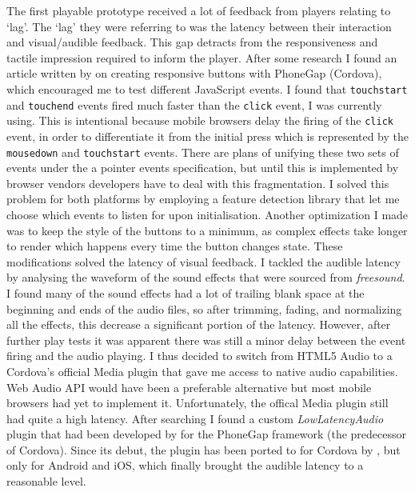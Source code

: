 \documentclass[final]{cmpreport}
\begin{document}
The first playable prototype received a lot of feedback from players relating to `lag'. The `lag' they were referring to was the latency between their interaction and visual/audible feedback. This gap detracts from the responsiveness and tactile impression required to inform the player. After some research I found an article written by \cite{Croft} on creating responsive buttons with PhoneGap (Cordova), which encouraged me to test different JavaScript events. I found that \texttt{touchstart} and \texttt{touchend} events fired much faster than the \texttt{click} event, I was currently using. This is intentional because mobile browsers delay the firing of the \texttt{click} event, in order to differentiate it from the initial press which is represented by the \texttt{mousedown} and \texttt{touchstart} events. There are plans of unifying these two sets of events under the a pointer events specification, but until this is implemented by browser vendors developers have to deal with this fragmentation. I solved this problem for both platforms by employing a feature detection library that let me choose which events to listen for upon initialisation. Another optimization I made was to keep the style of the buttons to a minimum, as complex effects take longer to render which happens every time the button changes state. These modifications solved the latency of visual feedback. I tackled the audible latency by analysing the waveform of the sound effects that were sourced from \textit{freesound}. I found many of the sound effects had a lot of trailing blank space at the beginning and ends of the audio files, so after trimming, fading, and normalizing all the effects, this decrease a significant portion of the latency. However, after further play tests it was apparent there was still a minor delay between the event firing and the audio playing. I thus decided to switch from HTML5 Audio to a Cordova's official Media plugin that gave me access to native audio capabilities. Web Audio API would have been a preferable alternative but most mobile browsers had yet to implement it. Unfortunately, the offical Media plugin still had quite a high latency. After searching I found a custom \textit{LowLatencyAudio} plugin that had been developed by \citep{Trice} for the PhoneGap framework (the predecessor of Cordova). Since its debut, the plugin has been ported to for Cordova by \citep{Xie}, but only for Android and iOS, which finally brought the audible latency to a reasonable level.
\end{document}
